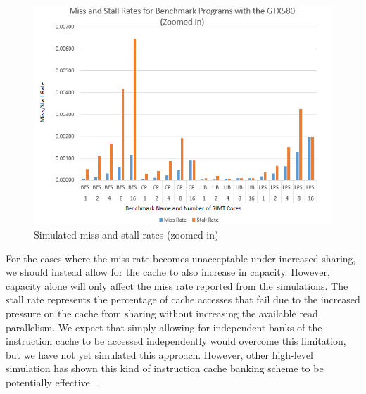 \begin{figure}
\centering
\includegraphics[width=\columnwidth]{graphics/miss_stalls_benchmarks_zoomed.png}
\caption{Simulated miss and stall rates (zoomed in) }
\label{fig:missStallsZoomed}
\end{figure}

For the cases where the miss rate becomes unacceptable under increased
sharing, we should instead allow for the cache to also increase in
capacity. 
However, capacity alone will only affect the miss rate reported from
the simulations.
The stall rate represents the percentage of cache accesses that fail
due to the increased pressure on the cache from sharing without
increasing the available read parallelism.
We expect that simply allowing for independent banks of the
instruction cache to be accessed independently would overcome this
limitation, but we have not yet simulated this approach.
However, other high-level simulation has shown this kind of
instruction cache banking scheme to be potentially
effective~\cite{kopta10}. 




